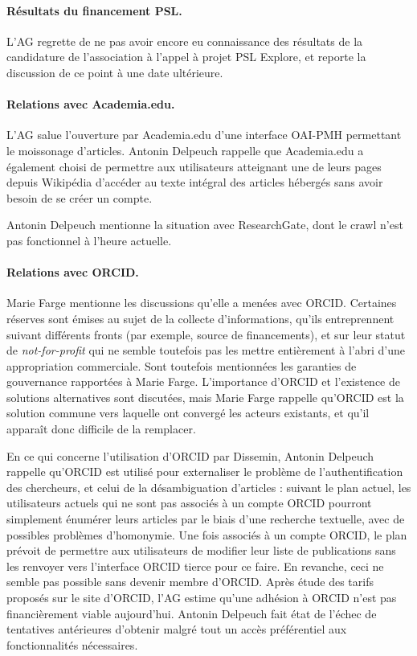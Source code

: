\documentclass{scrartcl}
\begin{document}
\paragraph{Résultats du financement PSL.} L'AG regrette de ne pas avoir encore
eu connaissance des résultats de la candidature de l'association à l'appel à
projet PSL Explore, et reporte la discussion de ce point à une date ultérieure.

\paragraph{Relations avec Academia.edu.} L'AG salue l'ouverture par Academia.edu
d'une interface OAI-PMH permettant le moissonage d'articles. Antonin Delpeuch
rappelle que Academia.edu a également choisi de permettre aux utilisateurs
atteignant une de leurs pages depuis Wikipédia d'accéder au texte intégral des
articles hébergés sans avoir besoin de se créer un compte.

Antonin Delpeuch mentionne la situation avec ResearchGate, dont le crawl n'est
pas fonctionnel à l'heure actuelle.

\paragraph{Relations avec ORCID.}
Marie Farge mentionne les discussions qu'elle a menées avec ORCID. Certaines réserves
sont émises au sujet de la collecte d'informations, qu'ils entreprennent suivant
différents fronts (par exemple, source de financements), et sur leur statut de
\emph{not-for-profit} qui ne semble toutefois pas les mettre entièrement à
l'abri d'une appropriation commerciale. Sont toutefois mentionnées les garanties
de gouvernance rapportées à Marie Farge. L'importance d'ORCID et l'existence
de solutions alternatives sont discutées, mais Marie Farge rappelle qu'ORCID est
la solution commune vers laquelle ont convergé les acteurs existants, et qu'il
apparaît donc difficile de la remplacer.

En ce qui concerne l'utilisation d'ORCID par Dissemin, Antonin Delpeuch rappelle
qu'ORCID est utilisé pour externaliser le problème de l'authentification des
chercheurs, et celui de la désambiguation d'articles : suivant le plan actuel,
les utilisateurs actuels qui ne sont pas associés à un compte ORCID pourront
simplement énumérer leurs articles par le biais d'une recherche textuelle, avec
de possibles problèmes d'homonymie. Une fois associés à un compte ORCID, le plan
prévoit de permettre aux utilisateurs de modifier leur liste de publications
sans les renvoyer vers l'interface ORCID tierce pour ce faire. En revanche, ceci
ne semble pas possible sans devenir membre d'ORCID. Après étude des tarifs
proposés sur le site d'ORCID, l'AG estime qu'une adhésion à ORCID n'est pas
financièrement viable aujourd'hui. Antonin Delpeuch fait état de l'échec de
tentatives antérieures d'obtenir malgré tout un accès préférentiel aux fonctionnalités
nécessaires.
\end{document}
